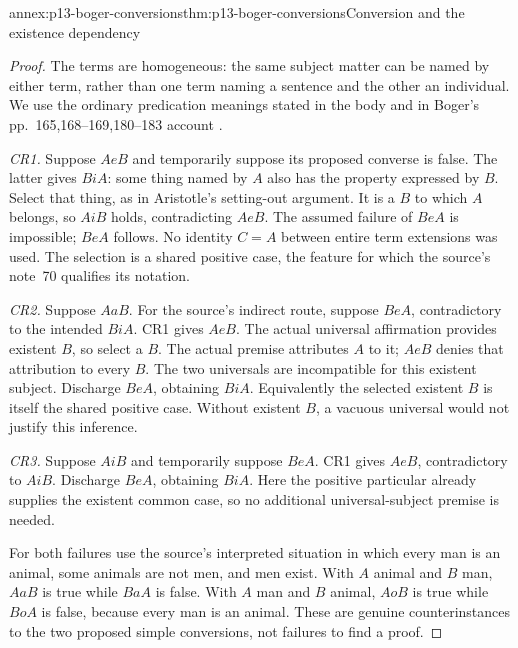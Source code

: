 \begin{annexitem}{annex:p13-boger-conversions}{thm:p13-boger-conversions}{Conversion and the existence dependency}
\begin{proof}
The terms are homogeneous: the same subject matter can be named by either
term, rather than one term naming a sentence and the other an individual.
We use the ordinary predication meanings stated in the body and in Boger's
pp.~165,168--169,180--183 account
\parencite{Boger2004UnderlyingLogic}.

\emph{CR1.} Suppose \(AeB\) and temporarily suppose its proposed
converse is false. The latter gives \(BiA\): some thing named by \(A\)
also has the property expressed by \(B\). Select that thing, as in
Aristotle's setting-out argument. It is a \(B\) to which \(A\) belongs,
so \(AiB\) holds, contradicting \(AeB\). The assumed failure of
\(BeA\) is impossible; \(BeA\) follows. No identity \(C=A\) between
entire term extensions was used. The selection is a shared positive
case, the feature for which the source's note~70 qualifies its notation.

\emph{CR2.} Suppose \(AaB\). For the source's indirect route, suppose
\(BeA\), contradictory to the intended \(BiA\). CR1 gives \(AeB\).
The actual universal affirmation provides existent \(B\), so select a
\(B\). The actual premise attributes \(A\) to it; \(AeB\) denies that
attribution to every \(B\). The two universals are incompatible for
this existent subject. Discharge \(BeA\), obtaining \(BiA\).
Equivalently the selected existent \(B\) is itself the shared positive
case. Without existent \(B\), a vacuous universal would not justify
this inference.

\emph{CR3.} Suppose \(AiB\) and temporarily suppose \(BeA\).
CR1 gives \(AeB\), contradictory to \(AiB\). Discharge \(BeA\),
obtaining \(BiA\). Here the positive particular already supplies the
existent common case, so no additional universal-subject premise is needed.

For both failures use the source's interpreted situation in which every
man is an animal, some animals are not men, and men exist. With \(A\)
animal and \(B\) man, \(AaB\) is true while \(BaA\) is false.
With \(A\) man and \(B\) animal, \(AoB\) is true while \(BoA\)
is false, because every man is an animal. These are genuine counterinstances
to the two proposed simple conversions, not failures to find a proof.
\end{proof}
\end{annexitem}

